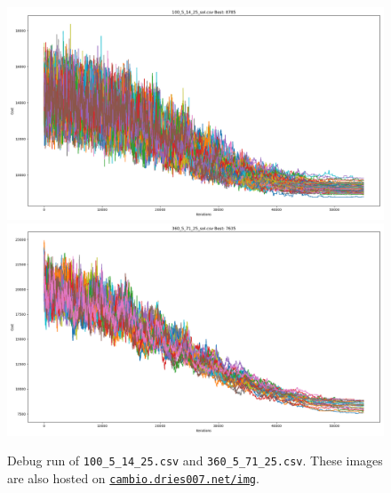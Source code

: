 \documentclass[11pt,a4paper]{article}
\begin{document}
\begin{figure}[ht]
    \centering
    \includegraphics[width=\textwidth]{../img/100_5_14_25.png}
\includegraphics[width=\textwidth]{../img/360_5_71_25.png}
    \caption{Debug run of \texttt{100\_5\_14\_25.csv} and \texttt{360\_5\_71\_25.csv}.
             These images are also hosted on \href{https://cambio.dries007.net/img/}{\texttt{cambio.dries007.net/img}}.}
    \label{fig:graph}
\end{figure}
\end{document}
